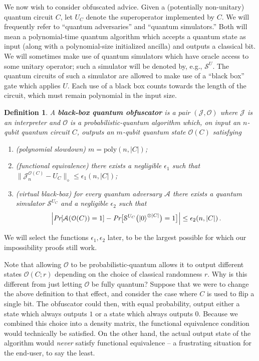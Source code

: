 \documentclass[11pt]{article}
\numberwithin{equation}{section}
\newtheorem{definition}{Definition}
\begin{document}
{We now wish to consider obfuscated advice. Given a (potentially non-unitary) quantum circuit $C$, let $U_C$ denote the superoperator implemented by $C$. We will frequently refer to ``quantum adversaries'' and ``quantum simulators.'' Both will mean a polynomial-time quantum algorithm which accepts a quantum state as input (along with a polynomial-size initialized ancilla) and outputs a classical bit. We will sometimes make use of quantum simulators which have oracle access to some unitary operator; such a simulator will be denoted by, e.g.,  $\mathcal S^U$. The quantum circuits of such a simulator are allowed to make use of a ``black box'' gate which applies $U$. Each use of a black box counts towards the length of the circuit, which must remain polynomial in the input size.
\begin{definition}
A \textbf{black-box quantum obfuscator} is a pair $(\mathcal J, \mathcal O)$ where $\mathcal J$ is an interpreter and $\mathcal O$ is a probabilistic-quantum algorithm which, on input an $n$-qubit quantum circuit $C$, outputs an $m$-qubit quantum state $\mathcal O(C)$ satisfying
\begin{enumerate}
\item (polynomial slowdown)  $m = \text{poly}(n, |C|)$;
\item (functional equivalence) there exists a negligible $\epsilon_1$ such that $\bigl\| \mathcal J_n^{\mathcal O(C)} - U_C \bigr\|_\diamond \leq \epsilon_1(n, |C|)$;
\item (virtual black-box) for every quantum adversary $\mathcal A$ there exists a quantum simulator $\mathcal S^{U_C}$ and a negligible $\epsilon_2$ such that
$$
\Bigl| \emph{Pr}[\mathcal A(\mathcal O(C)) = 1] - \emph{Pr}\bigl[\mathcal S^{U_C}\bigl({\left\vert{0}\right\rangle}^{\otimes |C|}\bigr) = 1\bigr] \Bigr| \leq \epsilon_2(n, |C|)\,.
$$
\end{enumerate}
\end{definition}
\noindent We will select the functions $\epsilon_1, \epsilon_2$ later, to be the largest possible for which our impossibility proofs still work.

Note that allowing $\mathcal O$ to be probabilistic-quantum allows it to output different states $\mathcal O(C; r)$ depending on the choice of classical randomness $r$. Why is this different from just letting $\mathcal O$ be fully quantum? Suppose that we were to change the above definition to that effect, and consider the case where $C$ is used to flip a single bit. The obfuscator could then, with equal probability, output either a state which always outputs $1$ or a state which always outputs $0$. Because we combined this choice into a density matrix, the functional equivalence condition would technically be satisfied. On the other hand, the actual output state of the algorithm would \emph{never} satisfy functional equivalence -- a frustrating situation for the end-user, to say the least.


}
\end{document}
